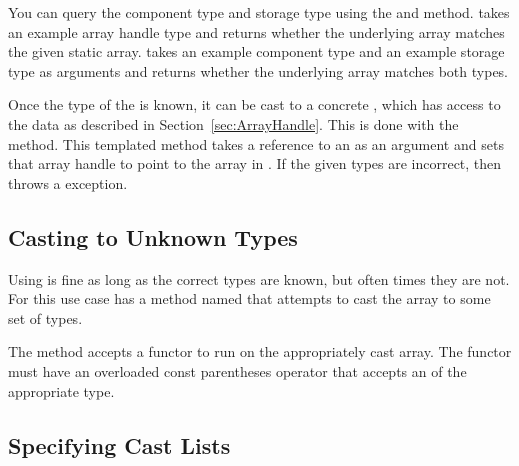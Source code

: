 You can query the component type and storage type using the
 and  method.
 takes an example array handle type and returns
whether the underlying array matches the given static array.
 takes an example component type and an example
storage type as arguments and returns whether the underlying array matches
both types.


Once the type of the  is known, it can
be cast to a concrete , which has access to the
data as described in Section~\ref{sec:ArrayHandle}. This is done with the
 method. This templated method takes a
reference to an  as an argument and sets that
array handle to point to the array in .
If the given types are incorrect, then  throws
a  exception.


\subsection{Casting to Unknown Types}


Using  is fine as long as the correct types are
known, but often times they are not. For this use case
 has a method named
 that attempts to cast the array to some set of
types.

The  method accepts a functor to run on the
appropriately cast array. The functor must have an overloaded const
parentheses operator that accepts an  of the
appropriate type.


\subsection{Specifying Cast Lists}
\label{sec:DynamicArrayHandleSpecifyingCastLists}

